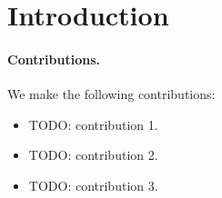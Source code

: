 %

\section{Introduction}
\label{sec:introduction}





\paragraph{Contributions.} We make the following contributions:
\begin{itemize}
  \item TODO: contribution 1.
  \item TODO: contribution 2.
  \item TODO: contribution 3.
\end{itemize}
